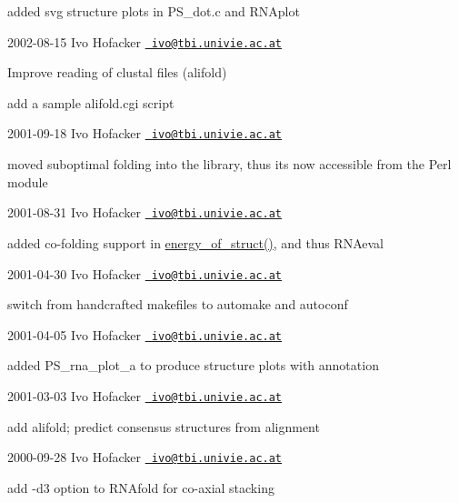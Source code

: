 \begin{DoxyItemize}
\item added svg structure plots in P\+S\+\_\+dot.\+c and R\+N\+Aplot
\end{DoxyItemize}

2002-\/08-\/15 Ivo Hofacker \href{mailto:ivo@tbi.univie.ac.at}{\texttt{ ivo@tbi.\+univie.\+ac.\+at}}


\begin{DoxyItemize}
\item Improve reading of clustal files (alifold)
\item add a sample alifold.\+cgi script
\end{DoxyItemize}

2001-\/09-\/18 Ivo Hofacker \href{mailto:ivo@tbi.univie.ac.at}{\texttt{ ivo@tbi.\+univie.\+ac.\+at}}


\begin{DoxyItemize}
\item moved suboptimal folding into the library, thus it\textquotesingle{}s now accessible from the Perl module
\end{DoxyItemize}

2001-\/08-\/31 Ivo Hofacker \href{mailto:ivo@tbi.univie.ac.at}{\texttt{ ivo@tbi.\+univie.\+ac.\+at}}


\begin{DoxyItemize}
\item added co-\/folding support in \mbox{\hyperlink{group__eval__deprecated_gac2b37fea2145c94d925a3f33378ef87b}{energy\+\_\+of\+\_\+struct()}}, and thus R\+N\+Aeval
\end{DoxyItemize}

2001-\/04-\/30 Ivo Hofacker \href{mailto:ivo@tbi.univie.ac.at}{\texttt{ ivo@tbi.\+univie.\+ac.\+at}}


\begin{DoxyItemize}
\item switch from handcrafted makefiles to automake and autoconf
\end{DoxyItemize}

2001-\/04-\/05 Ivo Hofacker \href{mailto:ivo@tbi.univie.ac.at}{\texttt{ ivo@tbi.\+univie.\+ac.\+at}}


\begin{DoxyItemize}
\item added P\+S\+\_\+rna\+\_\+plot\+\_\+a to produce structure plots with annotation
\end{DoxyItemize}

2001-\/03-\/03 Ivo Hofacker \href{mailto:ivo@tbi.univie.ac.at}{\texttt{ ivo@tbi.\+univie.\+ac.\+at}}


\begin{DoxyItemize}
\item add alifold; predict consensus structures from alignment
\end{DoxyItemize}

2000-\/09-\/28 Ivo Hofacker \href{mailto:ivo@tbi.univie.ac.at}{\texttt{ ivo@tbi.\+univie.\+ac.\+at}}


\begin{DoxyItemize}
\item add -\/d3 option to R\+N\+Afold for co-\/axial stacking 
\end{DoxyItemize}